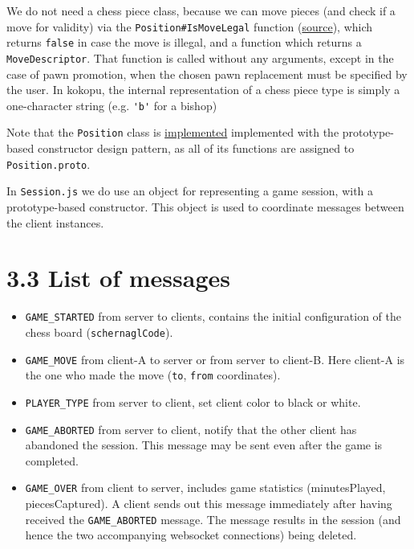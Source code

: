 \documentclass{article}
\begin{document}
We do not need a chess piece class, because we can move pieces (and check if a move for validity) via the \verb|Position#IsMoveLegal| function
(\href{https://kokopu.yo35.org/docs/Position.html#isMoveLegal(from, to) → \{boolean|function\}
}{source}), 
which returns \verb|false| in case the move is illegal, and a function which returns a \verb|MoveDescriptor|.
That function is called without any arguments, except in the case of pawn promotion, when the chosen pawn replacement must be specified by the user.
In kokopu, the internal representation of a chess piece type is simply a one-character string (e.g. \verb|'b'| for a bishop)

Note that the \verb|Position| class is \href{https://github.com/yo35/kokopu/blob/master/src/position.js}{implemented} implemented with the prototype-based constructor design pattern, as all of its functions are assigned to \verb|Position.proto|.

In \verb|Session.js| we do use an object for representing a game session, with a prototype-based constructor. This object is used to coordinate messages between the client instances.

\section*{3.3 List of messages}

\begin{itemize}
    \item \verb|GAME_STARTED| from server to clients, contains the initial configuration of the chess board (\verb|schernaglCode|).
    \item \verb|GAME_MOVE| from client-A to server or from server to client-B. Here client-A is the one who made the move (\verb|to|, \verb|from| coordinates).
    \item \verb|PLAYER_TYPE| from server to client, set client color to black or white.
    \item \verb|GAME_ABORTED| from server to client, notify that the other client has abandoned the session. This message may be sent even after the game is completed.
    \item \verb|GAME_OVER| from client to server, includes game statistics (minutesPlayed, piecesCaptured). A client sends out this message immediately after having received the \verb|GAME_ABORTED| message. The message results in the session (and hence the two accompanying websocket connections) being deleted.
\end{itemize}
\end{document}
